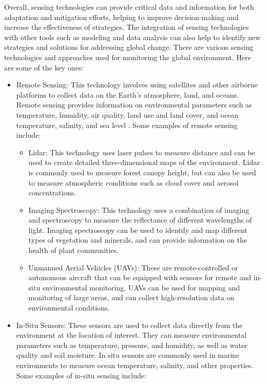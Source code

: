 Overall, sensing technologies can provide critical data and information for both adaptation and mitigation efforts, helping to improve decision-making and increase the effectiveness of strategies. The integration of sensing technologies with other tools such as modeling and data analysis can also help to identify new strategies and solutions for addressing global change. There are various sensing technologies and approaches used for monitoring the global environment. Here are some of the key ones:
\begin{itemize}
\item Remote Sensing: This technology involves using satellites and other airborne platforms to collect data on the Earth's atmosphere, land, and oceans. Remote sensing provides information on environmental parameters such as temperature, humidity, air quality, land use and land cover, and ocean temperature, salinity, and sea level \cite{Thenkabail2019, Buyantuyev2017, Gamon2016, Wang2017, Pasher2019}. Some examples of remote sensing include:
  \begin{itemize}
    \item Lidar: This technology uses laser pulses to measure distance and can be used to create detailed three-dimensional maps of the environment. Lidar is commonly used to measure forest canopy height, but can also be used to measure atmospheric conditions such as cloud cover and aerosol concentrations.
    \item Imaging Spectroscopy: This technology uses a combination of imaging and spectroscopy to measure the reflectance of different wavelengths of light. Imaging spectroscopy can be used to identify and map different types of vegetation and minerals, and can provide information on the health of plant communities.
    \item Unmanned Aerial Vehicles (UAVs): These are remote-controlled or autonomous aircraft that can be equipped with sensors for remote and in-situ  environmental monitoring. UAVs can be used for mapping and monitoring of large areas, and can collect high-resolution data on environmental conditions.
  \end{itemize}
\item In-Situ Sensors: These sensors are used to collect data directly from the environment at the location of interest. They can measure environmental parameters such as temperature, pressure, and humidity, as well as water quality and soil moisture. In situ sensors are commonly used in marine environments to measure ocean temperature, salinity, and other properties. Some examples of in-situ sensing include:

\end{itemize}
